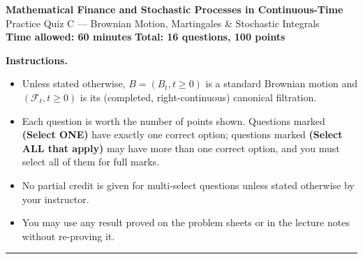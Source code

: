 \documentclass[11pt]{article}
\begin{document}
\begin{center}
{\LARGE\bfseries Mathematical Finance and Stochastic Processes in Continuous-Time}\\[4pt]
{\Large Practice Quiz C --- Brownian Motion, Martingales \& Stochastic Integrals}\\[8pt]
\textbf{Time allowed: 60 minutes} \qquad \textbf{Total: 16 questions, 100 points}
\end{center}

\vspace{4pt}
\noindent\textbf{Instructions.}
\begin{itemize}[nosep,leftmargin=*]
  \item Unless stated otherwise, $B=(B_t,t\ge0)$ is a standard Brownian motion and $(\mathcal F_t,t\ge0)$ is its (completed, right-continuous) canonical filtration.
  \item Each question is worth the number of points shown. Questions marked \textbf{(Select ONE)} have exactly one correct option; questions marked \textbf{(Select ALL that apply)} may have more than one correct option, and you must select all of them for full marks.
  \item No partial credit is given for multi-select questions unless stated otherwise by your instructor.
  \item You may use any result proved on the problem sheets or in the lecture notes without re-proving it.
\end{itemize}

\vspace{10pt}
\hrule
\vspace{10pt}
\end{document}
